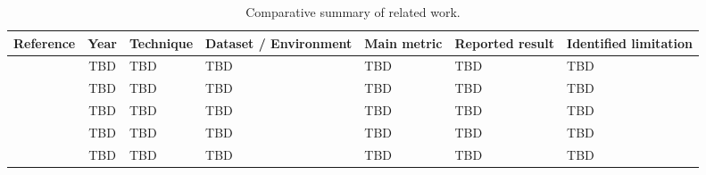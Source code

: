 \begin{table}[!t]
\centering
\caption{Comparative summary of related work.}
\label{tab:comparative}
\footnotesize
\setlength{\tabcolsep}{4pt}
\begin{tabularx}{\textwidth}{@{}l c P{2.4cm} P{2.4cm} P{2.0cm} P{1.8cm} Y@{}}
\toprule
\textbf{Reference} & \textbf{Year} & \textbf{Technique} &
\textbf{Dataset / Environment} & \textbf{Main metric} &
\textbf{Reported result} & \textbf{Identified limitation}\\
\midrule
\cite{ref01} & TBD & TBD & TBD & TBD & TBD & TBD\\
\cite{ref02} & TBD & TBD & TBD & TBD & TBD & TBD\\
\cite{ref03} & TBD & TBD & TBD & TBD & TBD & TBD\\
\cite{ref04} & TBD & TBD & TBD & TBD & TBD & TBD\\
\cite{ref05} & TBD & TBD & TBD & TBD & TBD & TBD\\
\bottomrule
\end{tabularx}
\end{table}